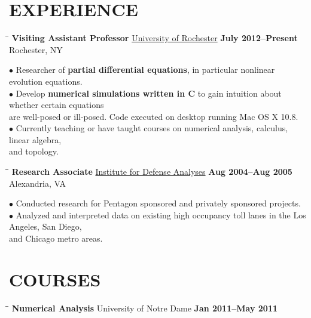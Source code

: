 \documentclass{resume}
\begin{document}
\begin{resume}
\begin{tabbing}
    \end{tabbing}

    \section{EXPERIENCE}
    \vspace{-0.1in}
    \begin{tabbing}
        \hspace{2.3in}\= \hspace{2.6in}\= \kill
        {\bf Visiting Assistant Professor} \>\href{http://math.rochester.edu/}{University of Rochester}     
        \>\textbf{July 2012--Present} \\
        \>Rochester, NY 
    \end{tabbing}\vspace{-15pt}    
    $\bullet$ Researcher of \textbf{partial differential equations}, in particular nonlinear evolution equations.  
    \\
    $\bullet$ Develop \textbf{numerical simulations written in C}  to gain intuition   about whether certain equations \\ \phantom{$\bullet$} are 
    well-posed or ill-posed. Code executed on desktop running Mac OS X 10.8.
    \\
    $\bullet$ Currently teaching or have taught courses on numerical analysis, calculus, linear algebra, \\ \phantom{$\bullet$} and topology. 
    \begin{tabbing}
        \hspace{2.3in}\= \hspace{2.6in}\= \kill
        {\bf Research Associate } \>\href{https://www.ida.org/}{Institute for
        Defense Analyses} \>  
        \textbf{Aug 2004--Aug 2005}\\
        \>Alexandria, VA
    \end{tabbing}\vspace{-15pt}
    $\bullet$ Conducted research for Pentagon sponsored and privately
    sponsored projects. 
    \\ 
    $\bullet$ Analyzed and interpreted data on existing high occupancy toll lanes in 
    the Los
    Angeles, San Diego, \\
    \phantom{$\bullet$} 
    and
    Chicago metro areas.  
    \section{COURSES}
    \vspace{-0.1in}
    \begin{tabbing}
        \hspace{2.3in}\= \hspace{2.6in}\= \kill
        {\bf Numerical Analysis} \>University of Notre Dame    
        \>\textbf{Jan 2011--May 2011} 
    \end{tabbing}
    \vspace{-0.4in}


\end{resume}
\end{document}

